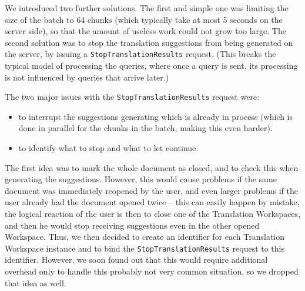 {We introduced two further solutions. The first and simple one was limiting the size of the batch to 64 chunks (which typically take at most 5 seconds on the server side), so that the amount of useless work could not grow too large. The second solution was to stop the translation suggestions from being generated on the server, by issuing a {\tt StopTranslationResults} request. (This breaks the typical model of processing the queries, where once a query is sent, its processing is not influenced by queries that arrive later.)

The two major issues with the {\tt StopTranslationResults} request were:

\begin{itemize}
	\item to interrupt the suggestions generating which is already in process (which is done in parallel for the chunks in the batch, making this even harder).
	\item to identify what to stop and what to let continue.
\end{itemize}

The first idea was to mark the whole document as closed, and to check this when generating the suggestions. However, this would cause problems if the same document was immediately reopened by the user, and even larger problems if the user already had the document opened twice -- this can easily happen by mistake, the logical reaction of the user is then to close one of the Translation Workspaces, and then he would stop receiving suggestions even in the other opened Workspace. Thus, we then decided to create an identifier for each Translation Workspace instance and to bind the {\tt StopTranslationResults} request to this identifier. However, we soon found out that this would require additional overhead only to handle this probably not very common situation, so we dropped that idea as well.

}
